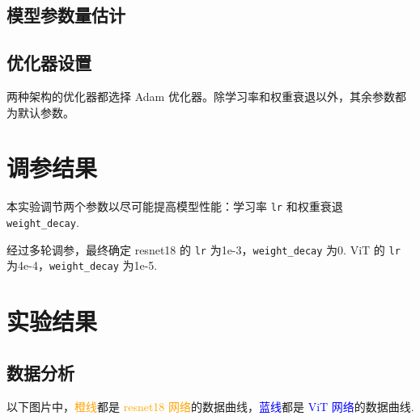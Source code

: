 \documentclass[notitlepage,cs4size,punct,oneside]{ctexrep}
\numberwithin{equation}{chapter}
\theoremstyle{mystyle}
\begin{document}
\subsection{模型参数量估计}


\subsection{优化器设置}
两种架构的优化器都选择 Adam 优化器。除学习率和权重衰退以外，其余参数都为默认参数。


\section{调参结果}
本实验调节两个参数以尽可能提高模型性能：学习率 \texttt{lr} 和权重衰退 \texttt{weight\_decay}.

经过多轮调参，最终确定 resnet18 的 \texttt{lr} 为1e-3，\texttt{weight\_decay} 为0. ViT 的 \texttt{lr} 为4e-4，\texttt{weight\_decay} 为1e-5.


\section{实验结果}
\subsection{数据分析}
以下图片中，\textcolor{orange}{橙线}都是 \textcolor{orange}{resnet18 网络}的数据曲线，\textcolor{blue}{蓝线}都是 \textcolor{blue}{ViT 网络}的数据曲线.
\end{document}
